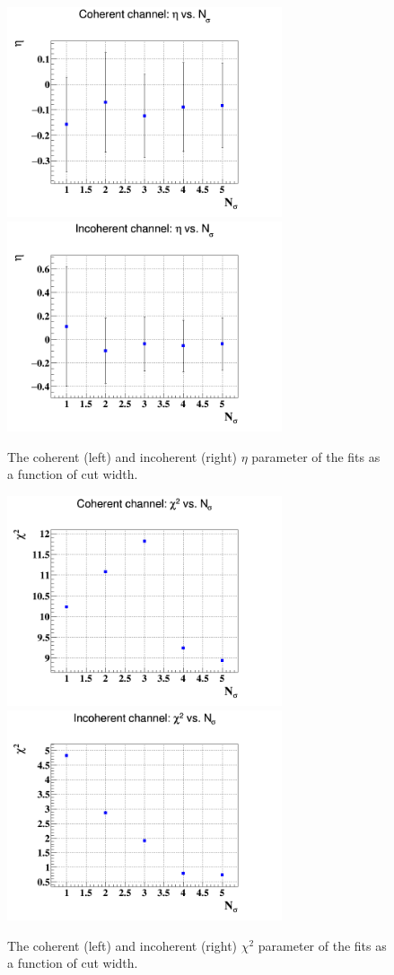\begin{figure}[tbp]
   \includegraphics[height=6.2cm]{fig/coh_eta_Nsig.png}
   \includegraphics[height=6.2cm]{fig/incoh_eta_Nsig.png}
   \caption{The coherent (left) and incoherent (right) $\eta$ parameter of the 
fits as a function of cut width.  }
\label{fig:sys_fit_eta}
\end{figure}

\begin{figure}[tbp]
   \includegraphics[height=6.2cm]{fig/coh_chi2_Nsig.png}
   \includegraphics[height=6.2cm]{fig/incoh_chi2_Nsig.png}
   \caption{The coherent (left) and incoherent (right) $\chi^{2}$ parameter of 
the fits as a function of cut width.}
\label{fig:sys_fit_chi2}
\end{figure}


